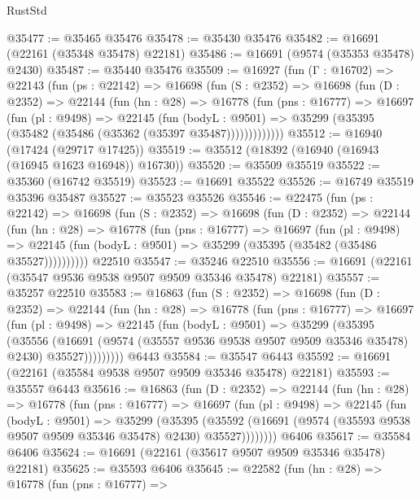 \begin{lexlean}{RustStd}
\begin{coremodule}
@35477 := @35465 @35476
@35478 := @35430 @35476
@35482 := @16691 (@22161 (@35348 @35478) @22181)
@35486 := @16691 (@9574 (@35353 @35478) @2430)
@35487 := @35440 @35476
@35509 := @16927
    (fun (Γ : @16702) =>
    @22143
      (fun (ps : @22142) =>
      @16698
        (fun (S : @2352) =>
        @16698
          (fun (D : @2352) =>
          @22144
            (fun (hn : @28) =>
            @16778
              (fun (pns : @16777) =>
              @16697
                (fun (pl : @9498) =>
                @22145
                  (fun (bodyL : @9501) =>
                  @35299 (@35395 (@35482 (@35486 (@35362 (@35397 @35487)))))))))))))
@35512 := @16940 (@17424 (@29717 @17425))
@35519 := @35512 (@18392 (@16940 (@16943 (@16945 @1623 @16948)) @16730))
@35520 := @35509 @35519
@35522 := @35360 (@16742 @35519)
@35523 := @16691 @35522
@35526 := @16749 @35519 @35396 @35487
@35527 := @35523 @35526
@35546 := @22475
    (fun (ps : @22142) =>
    @16698
      (fun (S : @2352) =>
      @16698
        (fun (D : @2352) =>
        @22144
          (fun (hn : @28) =>
          @16778
            (fun (pns : @16777) =>
            @16697
              (fun (pl : @9498) =>
              @22145 (fun (bodyL : @9501) => @35299 (@35395 (@35482 (@35486 @35527))))))))))
    @22510
@35547 := @35246 @22510
@35556 := @16691 (@22161 (@35547 @9536 @9538 @9507 @9509 @35346 @35478) @22181)
@35557 := @35257 @22510
@35583 := @16863
    (fun (S : @2352) =>
    @16698
      (fun (D : @2352) =>
      @22144
        (fun (hn : @28) =>
        @16778
          (fun (pns : @16777) =>
          @16697
            (fun (pl : @9498) =>
            @22145
              (fun (bodyL : @9501) =>
              @35299
                (@35395
                  (@35556
                    (@16691
                      (@9574 (@35557 @9536 @9538 @9507 @9509 @35346 @35478) @2430)
                      @35527)))))))))
    @6443
@35584 := @35547 @6443
@35592 := @16691 (@22161 (@35584 @9538 @9507 @9509 @35346 @35478) @22181)
@35593 := @35557 @6443
@35616 := @16863
    (fun (D : @2352) =>
    @22144
      (fun (hn : @28) =>
      @16778
        (fun (pns : @16777) =>
        @16697
          (fun (pl : @9498) =>
          @22145
            (fun (bodyL : @9501) =>
            @35299
              (@35395
                (@35592
                  (@16691 (@9574 (@35593 @9538 @9507 @9509 @35346 @35478) @2430) @35527))))))))
    @6406
@35617 := @35584 @6406
@35624 := @16691 (@22161 (@35617 @9507 @9509 @35346 @35478) @22181)
@35625 := @35593 @6406
@35645 := @22582
    (fun (hn : @28) =>
    @16778
      (fun (pns : @16777) =>

\end{coremodule}
\end{lexlean}

